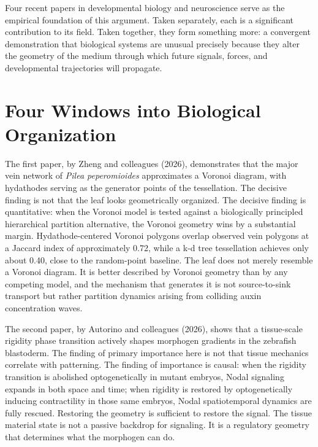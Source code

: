 \documentclass[12pt, a4paper, openany]{book}
\theoremstyle{definition}
\theoremstyle{remark}
\begin{document}
Four recent papers in developmental biology and neuroscience serve as the empirical foundation of this argument. Taken separately, each is a significant contribution to its field. Taken together, they form something more: a convergent demonstration that biological systems are unusual precisely because they alter the geometry of the medium through which future signals, forces, and developmental trajectories will propagate.

\section*{Four Windows into Biological Organization}

The first paper, by Zheng and colleagues (2026), demonstrates that the major vein network of \textit{Pilea peperomioides} approximates a Voronoi diagram, with hydathodes serving as the generator points of the tessellation. The decisive finding is not that the leaf looks geometrically organized. The decisive finding is quantitative: when the Voronoi model is tested against a biologically principled hierarchical partition alternative, the Voronoi geometry wins by a substantial margin. Hydathode-centered Voronoi polygons overlap observed vein polygons at a Jaccard index of approximately 0.72, while a k-d tree tessellation achieves only about 0.40, close to the random-point baseline. The leaf does not merely resemble a Voronoi diagram. It is better described by Voronoi geometry than by any competing model, and the mechanism that generates it is not source-to-sink transport but rather partition dynamics arising from colliding auxin concentration waves.

The second paper, by Autorino and colleagues (2026), shows that a tissue-scale rigidity phase transition actively shapes morphogen gradients in the zebrafish blastoderm. The finding of primary importance here is not that tissue mechanics correlate with patterning. The finding of importance is causal: when the rigidity transition is abolished optogenetically in mutant embryos, Nodal signaling expands in both space and time; when rigidity is restored by optogenetically inducing contractility in those same embryos, Nodal spatiotemporal dynamics are fully rescued. Restoring the geometry is sufficient to restore the signal. The tissue material state is not a passive backdrop for signaling. It is a regulatory geometry that determines what the morphogen can do.
\end{document}
